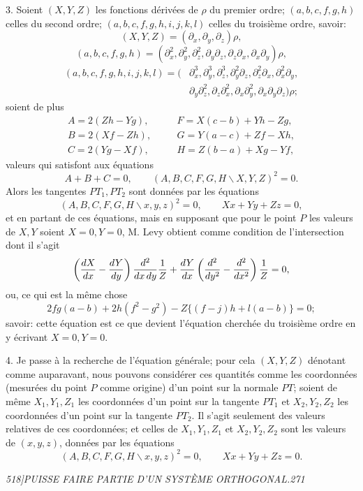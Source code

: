\documentclass[11pt]{article}
\newcommand{\phead}[3]{\noindent\textit{#1\hfill #2\hfill #3}\par\medskip}
\newcommand{\qform}[2]{(#1\backslash #2)^2}
\begin{document}
3. Soient $(X,Y,Z)$ les fonctions d\'eriv\'ees de $\rho$ du premier ordre; $(a,b,c,f,g,h)$
celles du second ordre; $(a,b,c,f,g,h,i,j,k,l)$ celles du troisi\`eme ordre, savoir:
\[
(X,Y,Z)=(\partial_x,\partial_y,\partial_z)\rho,
\]
\[
(a,b,c,f,g,h)=(\partial_x^2,\partial_y^2,\partial_z^2,\partial_y\partial_z,
\partial_z\partial_x,\partial_x\partial_y)\rho,
\]
\[
\begin{split}
(a,b,c,f,g,h,i,j,k,l)=(&\partial_x^3,\partial_y^3,\partial_z^3,\partial_y^2\partial_z,
\partial_z^2\partial_x,\partial_x^2\partial_y,\\
&\partial_y\partial_z^2,\partial_z\partial_x^2,\partial_x\partial_y^2,
\partial_x\partial_y\partial_z)\rho;
\end{split}
\]
soient de plus
\[
\begin{array}{lll}
A=2(Zh-Yg),&\quad& F=X(c-b)+Yh-Zg,\\
B=2(Xf-Zh),&& G=Y(a-c)+Zf-Xh,\\
C=2(Yg-Xf),&& H=Z(b-a)+Xg-Yf,
\end{array}
\]
valeurs qui satisfont aux \'equations
\[
A+B+C=0,\qquad \qform{A,B,C,F,G,H}{X,Y,Z}=0.
\]
Alors les tangentes $PT_1,PT_2$ sont donn\'ees par les \'equations
\[
\qform{A,B,C,F,G,H}{x,y,z}=0,\qquad Xx+Yy+Zz=0,
\]
et en partant de ces \'equations, mais en supposant que pour le point $P$ les valeurs
de $X,Y$ soient $X=0,Y=0$, M. Levy obtient comme condition de l'intersection dont il
s'agit
\[
\left({dX\over dx}-{dY\over dy}\right){d^2\over dx\,dy}{1\over Z}
+{dY\over dx}\left({d^2\over dy^2}-{d^2\over dx^2}\right){1\over Z}=0,
\]
ou, ce qui est la m\^eme chose
\[
2fg(a-b)+2h(f^2-g^2)-Z\{(f-j)h+l(a-b)\}=0;
\]
savoir: cette \'equation est ce que devient l'\'equation cherch\'ee du troisi\`eme ordre en
y \'ecrivant $X=0,Y=0$.

4. Je passe \`a la recherche de l'\'equation g\'en\'erale; pour cela $(X,Y,Z)$ d\'enotant
comme auparavant, nous pouvons consid\'erer ces quantit\'es comme les coordonn\'ees
(mesur\'ees du point $P$ comme origine) d'un point sur la normale $PT$; soient de
m\^eme $X_1,Y_1,Z_1$ les coordonn\'ees d'un point sur la tangente $PT_1$ et
$X_2,Y_2,Z_2$ les coordonn\'ees d'un point sur la tangente $PT_2$. Il s'agit seulement
des valeurs relatives de ces coordonn\'ees; et celles de $X_1,Y_1,Z_1$ et
$X_2,Y_2,Z_2$ sont les valeurs de $(x,y,z)$, donn\'ees par les \'equations
\[
\qform{A,B,C,F,G,H}{x,y,z}=0,\qquad Xx+Yy+Zz=0.
\]

\clearpage

\phead{518]}{PUISSE FAIRE PARTIE D'UN SYST\`EME ORTHOGONAL.}{271}
\end{document}
